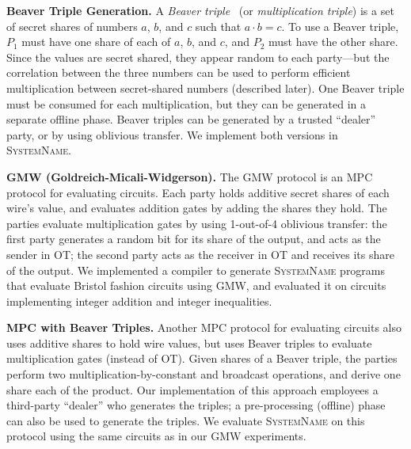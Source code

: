 \documentclass[conference]{IEEEtran}
\renewcommand{\paragraph}[1]{\vspace*{2pt}\noindent\textbf{#1}}
\newcommand{\system}{\textsc{SystemName}\xspace}
\begin{document}

\paragraph{Beaver Triple Generation.}
A \emph{Beaver triple}~\cite{todo} (or \emph{multiplication triple}) is a set of secret shares of numbers $a$, $b$, and $c$ such that $a \cdot b = c$. To use a Beaver triple, $P_1$ must have one share of each of $a$, $b$, and $c$, and $P_2$ must have the other share. Since the values are secret shared, they appear random to each party---but the correlation between the three numbers can be used to perform efficient multiplication between secret-shared numbers (described later). One Beaver triple must be consumed for each multiplication, but they can be generated in a separate offline phase. Beaver triples can be generated by a trusted ``dealer'' party, or by using oblivious transfer. We implement both versions in \system.

\paragraph{GMW (Goldreich-Micali-Widgerson).}
The GMW protocol is an MPC protocol for evaluating circuits. Each party holds additive secret shares of each wire's value, and evaluates addition gates by adding the shares they hold. The parties evaluate multiplication gates by using 1-out-of-4 oblivious transfer: the first party generates a random bit for its share of the output, and acts as the sender in OT; the second party acts as the receiver in OT and receives its share of the output. We implemented a compiler to generate \system programs that evaluate  Bristol fashion circuits using GMW, and evaluated it on circuits implementing integer addition and integer inequalities.

\paragraph{MPC with Beaver Triples.}
Another MPC protocol for evaluating circuits also uses additive shares to hold wire values, but uses Beaver triples to evaluate multiplication gates (instead of OT). Given shares of a Beaver triple, the parties perform two multiplication-by-constant and broadcast operations, and derive one share each of the product. Our implementation of this approach employees a third-party ``dealer'' who generates the triples; a pre-processing (offline) phase can also be used to generate the triples. We evaluate \system on this protocol using the same circuits as in our GMW experiments.
\end{document}

